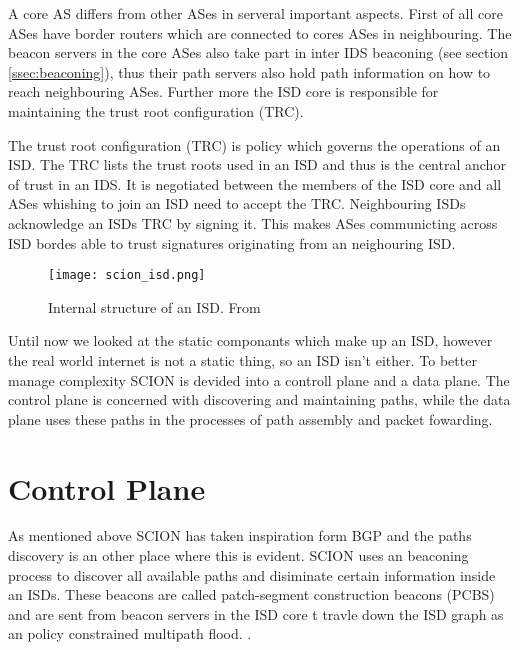 \documentclass[../eva1_scion.tex]{subfiles}
\begin{document}
    A core AS differs from other ASes in serveral important aspects. First of all core ASes have border routers which are connected to cores ASes in neighbouring. The beacon servers in the core ASes also take part in inter IDS beaconing (see section \ref{ssec:beaconing}), thus their path servers also hold path information on how to reach neighbouring ASes. Further more the ISD core is responsible for maintaining the trust root configuration (TRC).

    The trust root configuration (TRC) is policy which governs the operations of an ISD. The TRC lists the trust roots used in an ISD and thus is the central anchor of trust in an IDS. It is negotiated between the members of the ISD core and all ASes whishing to join  an ISD need to accept the TRC. Neighbouring ISDs acknowledge an ISDs TRC by signing it. This makes ASes communicting across ISD bordes able to trust signatures originating from an neighouring ISD. 

    \begin{figure}[h]
        \centering
        \texttt{[image: scion\_isd.png]}
        \caption{Internal structure of an ISD. From \cite{scion_2017}}%
        \label{fig:isd}
    \end{figure}

    Until now we looked at the static componants which make up an ISD, however the real world internet is not a static thing, so an ISD isn't either. To better manage complexity SCION is devided into a controll plane and a data plane. The control plane is concerned with discovering and maintaining paths, while the data plane uses these paths in the processes of path assembly and packet fowarding.

    \section{Control Plane}
    As mentioned above SCION has taken inspiration form BGP and the paths discovery is an other place where this is evident. SCION uses an beaconing process to discover all available paths and disiminate certain information inside an ISDs.  These beacons are called patch-segment construction beacons (PCBS) and are  sent from beacon servers in the ISD core t travle down the ISD graph as an policy constrained multipath flood. \cite{scion_2011}.
\end{document}

